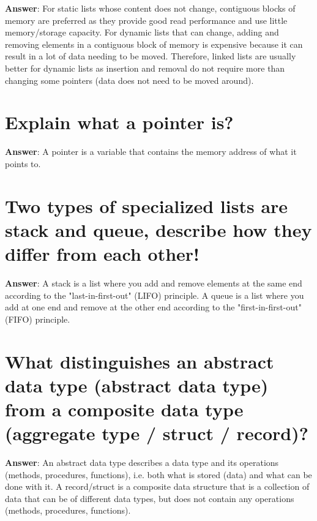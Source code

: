 \documentclass[a4paper,11pt,oneside]{book}
\begin{document}
\begin{sloppypar}
\label{q:262:sa:en:True}

\textbf{Answer}: For static lists whose content does not change, contiguous blocks of memory are preferred as they provide good read performance and use little memory/storage capacity. For dynamic lists that can change, adding and removing elements in a contiguous block of memory is expensive because it can result in a lot of data needing to be moved. Therefore, linked lists are usually better for dynamic lists as insertion and removal do not require more than changing some pointers (data does not need to be moved around).



\section{Explain what a pointer is?}

\label{q:263:sa:en:True}

\textbf{Answer}: A pointer is a variable that contains the memory address of what it points to.



\section{Two types of specialized lists are stack and queue, describe how they differ from each other!}

\label{q:264:sa:en:True}

\textbf{Answer}: A stack is a list where you add and remove elements at the same end according to the "last-in-first-out" (LIFO) principle. A queue is a list where you add at one end and remove at the other end according to the "first-in-first-out" (FIFO) principle.



\section{What distinguishes an abstract data type (abstract data type) from a composite data type (aggregate type / struct / record)?}

\label{q:265:sa:en:True}

\textbf{Answer}: An abstract data type describes a data type and its operations (methods, procedures, functions), i.e. both what is stored (data) and what can be done with it. A record/struct is a composite data structure that is a collection of data that can be of different data types, but does not contain any operations (methods, procedures, functions).




\end{sloppypar}
\end{document}
